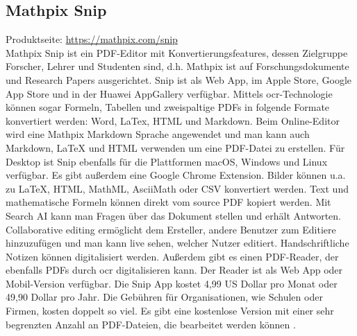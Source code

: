 \subsection{Mathpix Snip}
Produktseite: \url{https://mathpix.com/snip} \\
Mathpix Snip ist ein PDF-Editor mit Konvertierungsfeatures, dessen Zielgruppe Forscher, Lehrer und Studenten sind, d.h. Mathpix ist auf Forschungsdokumente und Research Papers ausgerichtet. Snip ist als Web App, im Apple Store, Google App Store und in der Huawei AppGallery verfügbar. Mittels \gls{ocr}-Technologie können sogar Formeln, Tabellen und zweispaltige PDFs in folgende Formate konvertiert werden: Word, LaTex, HTML und Markdown. Beim Online-Editor wird eine Mathpix Markdown Sprache angewendet
und man kann auch Markdown, LaTeX und HTML verwenden um eine PDF-Datei zu erstellen. Für Desktop ist Snip ebenfalls für die Plattformen macOS, Windows und Linux verfügbar. Es gibt außerdem eine Google Chrome Extension. Bilder können u.a. zu LaTeX, HTML, MathML, AsciiMath oder CSV konvertiert werden. Text und mathematische Formeln können direkt vom source PDF kopiert werden. Mit Search AI kann man Fragen über das Dokument stellen und erhält Antworten. Collaborative editing ermöglicht dem Ersteller, andere Benutzer zum Editiere hinzuzufügen und man kann live sehen, welcher Nutzer editiert. Handschriftliche Notizen können digitalisiert werden. Außerdem gibt es einen PDF-Reader, der ebenfalls PDFs durch \gls{ocr} digitalisieren kann. Der Reader ist als Web App oder Mobil-Version verfügbar. Die Snip App kostet 4,99 US Dollar pro Monat oder 49,90 Dollar pro Jahr. Die Gebühren für Organisationen, wie Schulen oder Firmen, kosten doppelt so viel. Es gibt eine kostenlose Version mit einer sehr begrenzten Anzahl an PDF-Dateien, die bearbeitet werden können \cite{snip-um}.